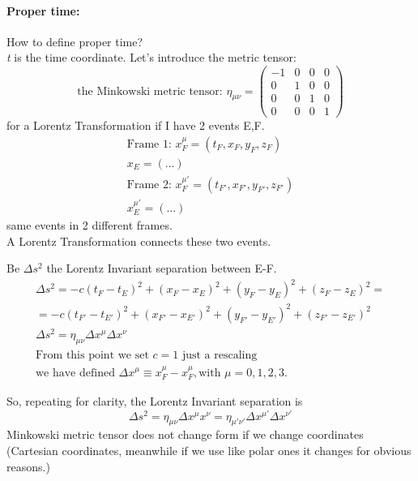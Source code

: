 \paragraph{Proper time:} How to define proper time? \\
\emph{t} is the time coordinate. Let's introduce the metric tensor:
\begin{equation}
	\text{the Minkowski metric tensor: } \eta_{\mu \nu } = \begin{pmatrix}
	-1 & 0 & 0 & 0 \\
	0 & 1 & 0 & 0 \\
	0 & 0 & 1 & 0 \\
	0 & 0 & 0 & 1
	\end{pmatrix} 		
\end{equation}
for a Lorentz Transformation if I have 2 events E,F.
\begin{gather*}
	\text{Frame 1: } x_{F}^{\mu } = \left( t_{F}, x_{F}, y_{F}, z_{F} \right)\\
	x_{E} = \left( ... \right) \\
	\text{Frame 2: } x_{F}^{\mu' } = \left( t_{F'}, x_{F'}, y_{F'}, z_{F'} \right) \\
	x_{E}^{\mu' } = \left( ... \right)	 
\end{gather*}
same events in 2 different frames. \\
A Lorentz Transformation connects these two events.

Be $\Delta s^{2}$ the Lorentz Invariant separation between E-F.
\begin{gather*}
\Delta s^{2} = -c \left( t_{F}-t_{E} \right)^{2} + \left( x_{F}- x_{E} \right)^{2} + \left( y_{F}-y_{E} \right)^{2} + \left( z_{F}-z_{E} \right)^{2} =\\
= -c (t_{F'}-t_{E'})^{2}  + (x_{F'}- x_{E'})^{2}  + (y_{F'}-y_{E'})^{2}  + (z_{F'}-z_{E'})^{2} \\
\Delta s^{2} = \eta_{\mu \nu } \Delta x^{\mu } \Delta x^{\nu } \\
\text{From this point we set } c = 1 \text{ just a rescaling} \\
\text{we have defined } \Delta x^{\mu } \equiv x_{F}^{\mu} - x_{F}^{\mu }, \text{with } \mu = 0,1,2,3.
\end{gather*}

So, repeating for clarity, the Lorentz Invariant separation is
\begin{equation}
\Delta s^{2} = \eta_{\mu  \nu } \Delta x^{\mu } x^{\nu } = \eta_{\mu'\nu'} \Delta x^{\mu '} \Delta x^{\nu'}
\end{equation}
Minkowski metric tensor does not change form if we change coordinates (Cartesian coordinates, meanwhile if we use like polar ones it changes for obvious reasons.) \par

